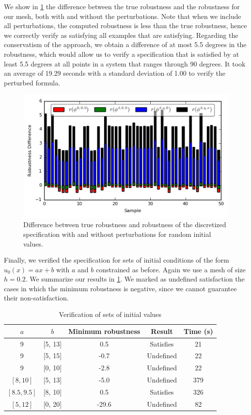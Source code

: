 \documentclass[letterpaper, 10 pt, conference]{ieeeconf/ieeeconf}
\begin{document}
We show in \cref{fig:res_diffs} the difference between the true robustness and
the robustness for our mesh, both with and without the perturbations. Note that
when we include all perturbations, the computed robustness is less than the true
robustness, hence we correctly verify as satisfying all examples
that are satisfying. Regarding the conservatism of the approach, we obtain a
difference of at most 5.5 degrees in the robustness, which would allow us to verify a
specification that is satisfied by at least 5.5 degrees at all points in a system
that ranges through 90 degrees. It took an average of 19.29 seconds with a
standard deviation of 1.00 to verify the perturbed formula.

\begin{figure}
    \centering
    \includegraphics[width=0.8\linewidth]{figures/cs_ran_init_results.png}
    \caption{Difference between true robustness and robustness of the
        discretized specification with and without perturbations for
        random initial values.}
    \label{fig:res_diffs}
\end{figure}


Finally, we verified the specification for sets of initial conditions of the
form $u_0(x) = a x + b$ with $a$ and $b$ constrained as before. Again we use a
mesh of size $h = 0.2$. We summarize our results in \cref{tab:res_sets}. We
marked as undefined satisfaction the cases in which the minimum robustness is
negative, since we cannot guarantee their non-satisfaction.

\begin{table}
\caption{Verification of sets of initial values}
\label{tab:res_sets}
\centering
\begin{tabular}{|c|c|c|c|c|}
    \hline
    $a$ & $b$ & Minimum robustness & Result & Time (s)  \\
    \hline
    9 & [5, 13] & 0.5 & Satisfies & 21 \\
    9 & [5, 15] & -0.7 & Undefined & 22 \\
    9 & [0, 10] & -2.8 & Undefined & 22 \\
    $[8, 10]$ & [5, 13] & -5.0 & Undefined & 379 \\
    $[8.5, 9.5]$ & [8, 10] & 0.5 & Satisfies & 326 \\
    $[5, 12]$ & [0, 20] & -29.6 & Undefined & 82 \\
    \hline
\end{tabular}
\end{table}
\end{document}
